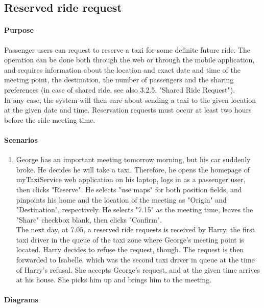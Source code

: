 \subsection{Reserved ride request}

\paragraph{Purpose}
Passenger users can request to reserve a taxi for some definite future ride. The operation can be done both through the web or through the mobile application, and requires information about the location and exact date and time of the meeting point, the destination, the number of passengers and the sharing preferences (in case of shared ride, see also 3.2.5, "Shared Ride Request").\\
In any case, the system will then care about sending a taxi to the given location at the given date and time. Reservation requests must occur at least two hours before the ride meeting time.

\paragraph{Scenarios}
\begin{enumerate}
	\item George has an important meeting tomorrow morning, but his car suddenly broke. He decides he will take a taxi. Therefore, he opens the homepage of myTaxiService web application on his laptop, logs in as a passenger user, then clicks "Reserve". He selects "use maps" for both position fields, and pinpoints his home and the location of the meeting as "Origin" and "Destination", respectively. He selects "7.15" as the meeting time, leaves the "Share" checkbox blank, then clicks "Confirm".\\
	The next day, at 7.05, a reserved ride requests is received by Harry, the first taxi driver in the queue of the taxi zone where George's meeting point is located. Harry decides to refuse the request, though. The request is then forwarded to Isabelle, which was the second taxi driver in queue at the time of Harry's refusal. She accepts George's request, and at the given time arrives at his house. She picks him up and brings him to the meeting.
\end{enumerate}

\paragraph{Diagrams}

